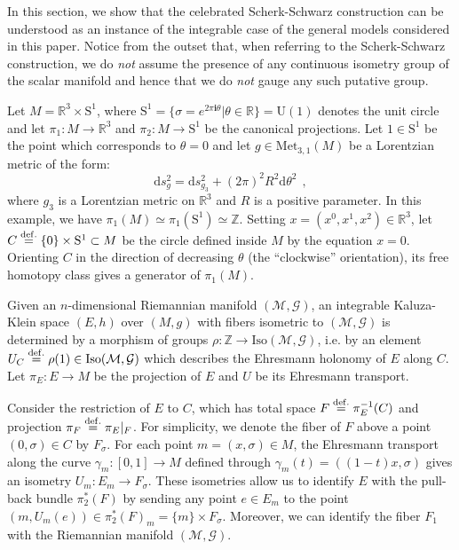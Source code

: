\documentclass[10pt, cmp, numbook, final, a4paper]{svjour}
\newcommand{\eqdef}{\stackrel{{\rm def.}}{=}}
\def\Z{\mathbb{Z}}
\def\R{\mathbb{R}}
\def\dd{\mathrm{d}}
\def\U{\mathrm{U}}
\newcommand{\be}{\begin{equation*}}
\newcommand{\ee}{\end{equation*}}
\newcommand{\cM}{\mathcal{M}}
\def\cG{\mathcal{G}}
\def\rS{\mathrm{S}}
\def\Met{\mathrm{Met}}
\def\Iso{\mathrm{Iso}}
\def\i{\mathbf{i}}
\begin{document}
In this section, we show that the celebrated Scherk-Schwarz
construction \cite{SS} can be understood as an instance of the
integrable case of the general models considered in this paper. Notice
from the outset that, when referring to the Scherk-Schwarz
construction, we do {\em not} assume the presence of any continuous
isometry group of the scalar manifold and hence that we do {\em not}
gauge any such putative group.

Let $M=\R^3\times \rS^1$, where $\rS^1=\{\sigma=e^{2\pi \i
  \theta}|\theta\in \R\}=\U(1)$ denotes the unit circle and let
$\pi_1:M\rightarrow \R^3$ and $\pi_2:M\rightarrow \rS^1$ be the
canonical projections. Let $1\in \rS^1$ be the point which corresponds
to $\theta=0$ and let $g\in \Met_{3,1}(M)$ be a Lorentzian metric of
the form:
\be
\dd s_g^2=\dd s_{g_3}^2+(2\pi)^2R^2\dd\theta^2~~,
\ee
where $g_3$ is a Lorentzian metric on $\R^3$ and $R$ is a positive
parameter. In this example, we have $\pi_1(M)\simeq \pi_1(\rS^1)\simeq
\Z$. Setting $x=(x^0,x^1,x^2)\in \R^3$, let $C\eqdef \{0\}\times
\rS^1\subset M$ be the circle defined inside $M$ by the equation
$x=0$. Orienting $C$ in the direction of decreasing $\theta$ (the
``clockwise'' orientation), its free homotopy class gives a generator
of $\pi_1(M)$.

Given an $n$-dimensional Riemannian manifold $(\cM,\cG)$, an
integrable Kaluza-Klein space $(E,h)$ over $(M,g)$ with fibers
isometric to $(\cM,\cG)$ is determined by a morphism of groups
$\rho:\Z\rightarrow \Iso(\cM,\cG)$, i.e. by an element $U_C\eqdef
\rho(1)\in \Iso(\cM,\cG)$ which describes the Ehresmann holonomy of
$E$ along $C$. Let $\pi_E:E\rightarrow M$ be the projection of $E$ and
$U$ be its Ehresmann transport.

Consider the restriction of $E$ to $C$, which has total space $F\eqdef
\pi_E^{-1}(C)$ and projection $\pi_F\eqdef \pi_E|_{F}$. For
simplicity, we denote the fiber of $F$ above a point $(0,\sigma)\in C$
by $F_\sigma$. For each point $m=(x,\sigma)\in M$, the Ehresmann
transport along the curve $\gamma_m:[0,1]\rightarrow M$ defined
through $\gamma_m(t)=((1-t)x,\sigma)$ gives an isometry
$U_m:E_m\rightarrow F_\sigma$. These isometries allow us to identify
$E$ with the pull-back bundle $\pi_2^\ast(F)$ by sending any point
$e\in E_m$ to the point $(m,U_m(e))\in \pi_2^\ast(F)_m=\{m\}\times
F_\sigma$.  Moreover, we can identify the fiber $F_1$ with the
Riemannian manifold $(\cM,\cG)$.
\end{document}
